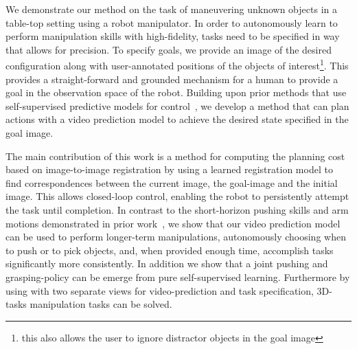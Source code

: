 We demonstrate our method on the task of maneuvering unknown objects in a table-top setting using a robot manipulator. In order to autonomously learn to perform
manipulation skills with high-fidelity, tasks need to be specified in way that allows for precision. To specify goals, we provide an image of the desired configuration along with user-annotated positions of the objects of interest\footnote{this also allows the user to ignore distractor objects in the goal image}. This provides a straight-forward and grounded mechanism for a human to provide a goal in the observation space of the robot.
Building upon prior methods that use self-supervised predictive models for control~\cite{foresight,sna,se3_control}, we develop a method that can plan actions with a video prediction model to achieve the desired state specified in the goal image.

The main contribution of this work is a method for computing the planning cost based on image-to-image registration by using a learned registration model to find correspondences between the current image, the goal-image and the initial image.
This allows closed-loop control, enabling the robot to persistently attempt the task until completion. In contrast to the short-horizon pushing skills and arm motions demonstrated in prior work~\cite{foresight,sna,se3_control}, we show that our video prediction model can be used to perform longer-term manipulations, autonomously choosing when to push or to  pick objects, and, when provided enough time, accomplish tasks significantly more consistently.
In addition we show that a joint pushing and grasping-policy can be emerge from pure self-supervised learning. Furthermore by using with two separate views for video-prediction and task specification, 3D-tasks manipulation tasks can be solved.



